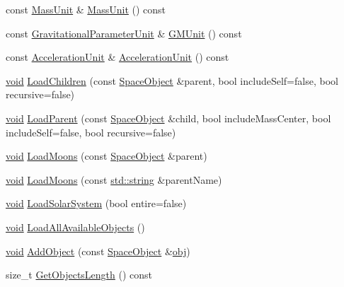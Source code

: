 \begin{DoxyCompactItemize}
\item 
const \hyperlink{_quantity_8h_a2dde25127542e6a5fcf7c085269b8963}{Mass\+Unit} \& \hyperlink{class_app_acf7486b4787ea7fe43abae0d166dfb5c}{Mass\+Unit} () const 
\item 
const \hyperlink{_quantity_8h_ac250a56b26235a8dc9d44fbbeabe2024}{Gravitational\+Parameter\+Unit} \& \hyperlink{class_app_a8487d93c3f260c9fc94f2ca40b526035}{G\+M\+Unit} () const 
\item 
const \hyperlink{_quantity_8h_aa1729851532d88933ff921f24a0bce3b}{Acceleration\+Unit} \& \hyperlink{class_app_a6227e7123ec66f2de575c3e8f8ad8380}{Acceleration\+Unit} () const 
\item 
\hyperlink{wglext_8h_a9e6b7f1933461ef318bb000d6bd13b83}{void} \hyperlink{class_app_ab41aea25a7f5312dfef22644138c1fac}{Load\+Children} (const \hyperlink{class_space_object}{Space\+Object} \&parent, bool include\+Self=false, bool recursive=false)
\item 
\hyperlink{wglext_8h_a9e6b7f1933461ef318bb000d6bd13b83}{void} \hyperlink{class_app_aa8eb4865cea9f3ffc31199f539e35e53}{Load\+Parent} (const \hyperlink{class_space_object}{Space\+Object} \&child, bool include\+Mass\+Center, bool include\+Self=false, bool recursive=false)
\item 
\hyperlink{wglext_8h_a9e6b7f1933461ef318bb000d6bd13b83}{void} \hyperlink{class_app_ae50b47e38db35856dbad40c3281603eb}{Load\+Moons} (const \hyperlink{class_space_object}{Space\+Object} \&parent)
\item 
\hyperlink{wglext_8h_a9e6b7f1933461ef318bb000d6bd13b83}{void} \hyperlink{class_app_ad163108cca1f0c17229627dc44a18d5b}{Load\+Moons} (const \hyperlink{glext_8h_ae84541b4f3d8e1ea24ec0f466a8c568b}{std\+::string} \&parent\+Name)
\item 
\hyperlink{wglext_8h_a9e6b7f1933461ef318bb000d6bd13b83}{void} \hyperlink{class_app_a481f856c3ca5b90d8bf903a4a208dfc5}{Load\+Solar\+System} (bool entire=false)
\item 
\hyperlink{wglext_8h_a9e6b7f1933461ef318bb000d6bd13b83}{void} \hyperlink{class_app_ab947a8da031b06d05bfa6dd392ba59bf}{Load\+All\+Available\+Objects} ()
\item 
\hyperlink{wglext_8h_a9e6b7f1933461ef318bb000d6bd13b83}{void} \hyperlink{class_app_a2feb5b0ad3a5018c3bf61e3920aaaf5a}{Add\+Object} (const \hyperlink{class_space_object}{Space\+Object} \&\hyperlink{glext_8h_a0c0d4701a6c89f4f7f0640715d27ab26}{obj})
\item 
size\+\_\+t \hyperlink{class_app_afec3098fabcf5728d0a50b3660322e85}{Get\+Objects\+Length} () const 

\end{DoxyCompactItemize}
